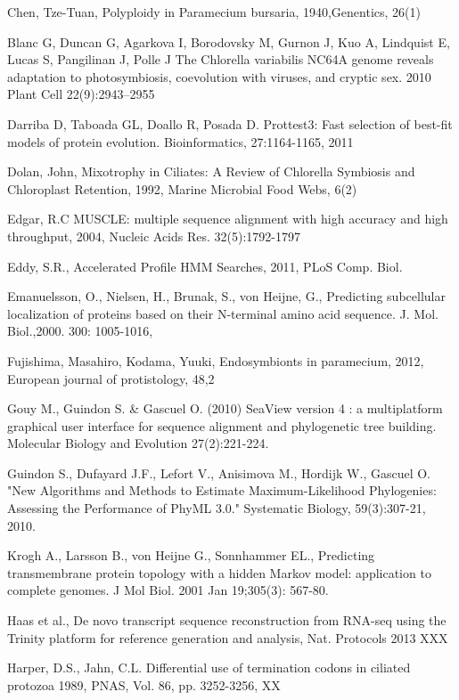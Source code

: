  
\noindent Chen, Tze-Tuan, Polyploidy in Paramecium bursaria, 1940,Genentics,  26(1)

 
\noindent Blanc G, Duncan G, Agarkova I, Borodovsky M, Gurnon J, Kuo A, Lindquist E, Lucas S, Pangilinan J, Polle J The Chlorella variabilis NC64A genome reveals adaptation to photosymbiosis, coevolution with viruses, and cryptic sex. 2010 Plant Cell 22(9):2943–2955

 
\noindent Darriba D, Taboada GL, Doallo R, Posada D. Prottest3: Fast selection of best-fit models of protein evolution. Bioinformatics, 27:1164-1165, 2011

 
\noindent Dolan, John, Mixotrophy in Ciliates: A Review of Chlorella Symbiosis and Chloroplast Retention, 1992,  Marine Microbial Food Webs,  6(2)

 
\noindent Edgar, R.C MUSCLE: multiple sequence alignment with high accuracy and high throughput, 2004, Nucleic Acids Res. 32(5):1792-1797 

 
\noindent Eddy, S.R., Accelerated Profile HMM Searches, 2011, PLoS Comp. Biol.

 
\noindent Emanuelsson, O., Nielsen, H., Brunak, S., von Heijne, G., Predicting subcellular localization of proteins based on their N-terminal amino acid sequence. J. Mol. Biol.,2000. 300: 1005-1016,

 
\noindent Fujishima, Masahiro,  Kodama, Yuuki, Endosymbionts in paramecium, 2012, European journal of protistology, 48,2

 
\noindent Gouy M., Guindon S. \& Gascuel O. (2010) SeaView version 4 : a multiplatform graphical user interface for sequence alignment and phylogenetic tree building. Molecular Biology and Evolution 27(2):221-224.

 
\noindent Guindon S., Dufayard J.F., Lefort V., Anisimova M., Hordijk W., Gascuel O. "New Algorithms and Methods to Estimate Maximum-Likelihood Phylogenies: Assessing the Performance of PhyML 3.0." Systematic Biology, 59(3):307-21, 2010.

 
\noindent Krogh A., Larsson B., von Heijne G., Sonnhammer EL., Predicting transmembrane protein topology with a hidden Markov model: application to complete genomes. J Mol Biol. 2001 Jan 19;305(3): 567-80.

 
\noindent Haas et al., De novo transcript sequence reconstruction from RNA-seq using the Trinity platform for reference generation and analysis, Nat. Protocols 2013 XXX

 
\noindent Harper, D.S., Jahn, C.L. Differential use of termination codons in ciliated protozoa 1989, PNAS, Vol. 86, pp. 3252-3256, XX

